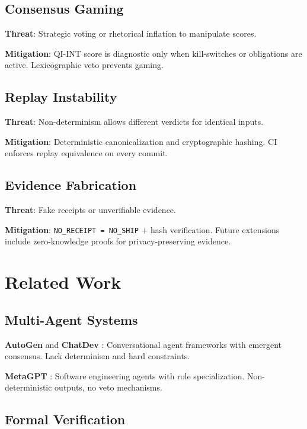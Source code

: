 \documentclass[11pt, letterpaper]{article}
\begin{document}
\subsection{Consensus Gaming}

\textbf{Threat}: Strategic voting or rhetorical inflation to manipulate scores.

\textbf{Mitigation}: QI-INT score is diagnostic only when kill-switches or obligations are active. Lexicographic veto prevents gaming.

\subsection{Replay Instability}

\textbf{Threat}: Non-determinism allows different verdicts for identical inputs.

\textbf{Mitigation}: Deterministic canonicalization and cryptographic hashing. CI enforces replay equivalence on every commit.

\subsection{Evidence Fabrication}

\textbf{Threat}: Fake receipts or unverifiable evidence.

\textbf{Mitigation}: \texttt{NO\_RECEIPT = NO\_SHIP} + hash verification. Future extensions include zero-knowledge proofs for privacy-preserving evidence.

\section{Related Work}

\subsection{Multi-Agent Systems}

\textbf{AutoGen} \cite{autogen} and \textbf{ChatDev} \cite{chatdev}: Conversational agent frameworks with emergent consensus. Lack determinism and hard constraints.

\textbf{MetaGPT} \cite{metagpt}: Software engineering agents with role specialization. Non-deterministic outputs, no veto mechanisms.

\subsection{Formal Verification}
\end{document}
